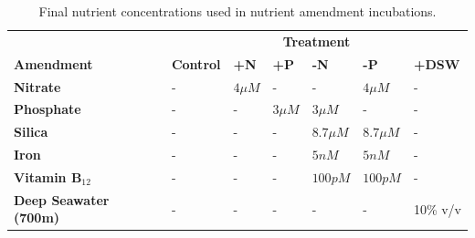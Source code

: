 \begin{table}[h!]
\centering
\caption{Final nutrient concentrations used in nutrient amendment incubations.}
\label{tab:c5t1}
\small
\begin{tabular}{lllllll}
                              & \multicolumn{6}{c}{\textbf{Treatment}}                                                   \\ 
\textbf{Amendment}            & \textbf{Control} & \textbf{+N} & \textbf{+P} & \textbf{-N} & \textbf{-P} & \textbf{+DSW} \\ \Xhline{2\arrayrulewidth}
\textbf{Nitrate}              & -                & $4 \mu M$   & -           & -           & $4 \mu M$   & -             \\ 
\textbf{Phosphate}            & -                & -           & $3 \mu M$   & $3 \mu M$   & -           & -             \\ 
\textbf{Silica}               & -                & -           & -           & $8.7 \mu M$ & $8.7 \mu M$ & -             \\ 
\textbf{Iron}                 & -                & -           & -           & $5 nM$      & $5 nM$      & -             \\ 
\textbf{Vitamin B$_{12}$}     & -                & -           & -           & $100 pM$    & $100 pM$    & -             \\ 
\textbf{Deep Seawater (700m)} & -                & -           & -           & -           & -           & 10\% v/v      \\ 
\end{tabular}
\end{table}

